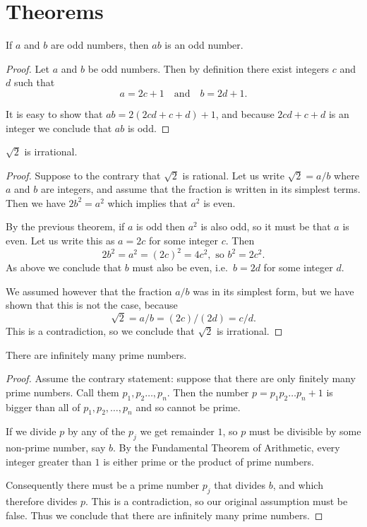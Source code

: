 
\chapter{Theorems}

\begin{theorem}
If $a$ and $b$ are odd numbers, then $ab$ is an odd number.
\begin{proof}
Let $a$ and $b$ be odd numbers. Then by definition there exist integers $c$ and $d$ such that 
\[
a=2c+1 \quad\text{and}\quad b=2d+1.
\]

It is easy to show that $ab = 2(2cd + c + d) + 1$, and because $2cd+c+d$ is an integer we conclude that $ab$ is odd.
\end{proof}
\end{theorem}

\begin{theorem}
$\sqrt{2}$ is irrational.
\begin{proof}
Suppose to the contrary that $\sqrt{2}$ is rational. Let us write $\sqrt{2} = a/b$ where $a$ and $b$ are integers, and assume that the fraction is written in its simplest terms.
Then we have $2b^2 = a^2$ which implies that $a^2$ is even.
\par
By the previous theorem, if $a$ is odd then $a^2$ is also odd, so it must be that $a$ is even. Let us write this as $a=2c$ for some integer $c$. Then
\[
2b^2 = a^2 = (2c)^2 = 4c^2, \text{ so } b^2 = 2c^2.
\]
As above we conclude that $b$ must also be even, i.e.\ $b = 2d$ for some integer $d$.
\par
We assumed however that the fraction $a/b$ was in its simplest form, but we have shown that this is not the case, because
\[
\sqrt{2} = a/b = (2c)/(2d) = c/d.
\]
This is a contradiction, so we conclude that $\sqrt{2}$ is irrational.
\end{proof}
\end{theorem}


\begin{theorem}
There are infinitely many prime numbers.
\begin{proof}
Assume the contrary statement: suppose that there are only finitely many prime numbers. Call them $p_1,p_2\ldots,p_n$.
Then the number $p = p_1p_2\ldots p_n + 1$ is bigger than all of $p_1,p_2,\ldots,p_n$ and so cannot be prime.
\par
If we divide $p$ by any of the $p_j$ we get remainder $1$, so $p$ must be divisible by some non-prime number, say $b$.
By the Fundamental Theorem of Arithmetic, every integer greater than $1$ is either prime or the product of prime numbers.
\par
Consequently there must be a prime number $p_j$ that divides $b$, and which therefore divides $p$.
This is a contradiction, so our original assumption must be false.
Thus we conclude that there are infinitely many prime numbers.
\end{proof}
\end{theorem}